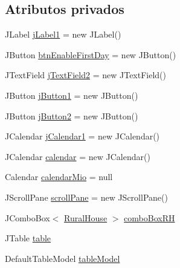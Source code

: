 \subsection*{Atributos privados}
\begin{DoxyCompactItemize}
\item 
J\+Label \mbox{\hyperlink{classgui_1_1_query_availability_client_advaced_g_u_i_a608d95691de8bd9b5faeb17a483ea525}{j\+Label1}} = new J\+Label()
\item 
J\+Button \mbox{\hyperlink{classgui_1_1_query_availability_client_advaced_g_u_i_a8e949d79027650d99ede8ae5b7c59887}{btn\+Enable\+First\+Day}} = new J\+Button()
\item 
J\+Text\+Field \mbox{\hyperlink{classgui_1_1_query_availability_client_advaced_g_u_i_adf1c51e6e9479b73b5f239eb1af49790}{j\+Text\+Field2}} = new J\+Text\+Field()
\item 
J\+Button \mbox{\hyperlink{classgui_1_1_query_availability_client_advaced_g_u_i_a342c983ca90829bed5f290c759dc0ca7}{j\+Button1}} = new J\+Button()
\item 
J\+Button \mbox{\hyperlink{classgui_1_1_query_availability_client_advaced_g_u_i_ae584d0234d4ec79e92a01087c1f34d8f}{j\+Button2}} = new J\+Button()
\item 
J\+Calendar \mbox{\hyperlink{classgui_1_1_query_availability_client_advaced_g_u_i_a6ff456ec71a8288c4866eb308477fef9}{j\+Calendar1}} = new J\+Calendar()
\item 
J\+Calendar \mbox{\hyperlink{classgui_1_1_query_availability_client_advaced_g_u_i_a7612f7358345c96e8c1a338c54a30371}{calendar}} = new J\+Calendar()
\item 
Calendar \mbox{\hyperlink{classgui_1_1_query_availability_client_advaced_g_u_i_a5cfcf4c3e3a783a9089b369a7a80a77c}{calendar\+Mio}} = null
\item 
J\+Scroll\+Pane \mbox{\hyperlink{classgui_1_1_query_availability_client_advaced_g_u_i_aff9fb296abe1a0bfe76a825ad4e75a46}{scroll\+Pane}} = new J\+Scroll\+Pane()
\item 
J\+Combo\+Box$<$ \mbox{\hyperlink{classdomain_1_1_rural_house}{Rural\+House}} $>$ \mbox{\hyperlink{classgui_1_1_query_availability_client_advaced_g_u_i_aadf6bbbf39771a8fe4131b2c04dbfb28}{combo\+Box\+RH}}
\item 
J\+Table \mbox{\hyperlink{classgui_1_1_query_availability_client_advaced_g_u_i_aa33f7209ce08cdbcef6e7e0c83d36b2f}{table}}
\item 
Default\+Table\+Model \mbox{\hyperlink{classgui_1_1_query_availability_client_advaced_g_u_i_a57b62ad5c71af3f84909da6fa6452e3b}{table\+Model}}

\end{DoxyCompactItemize}
